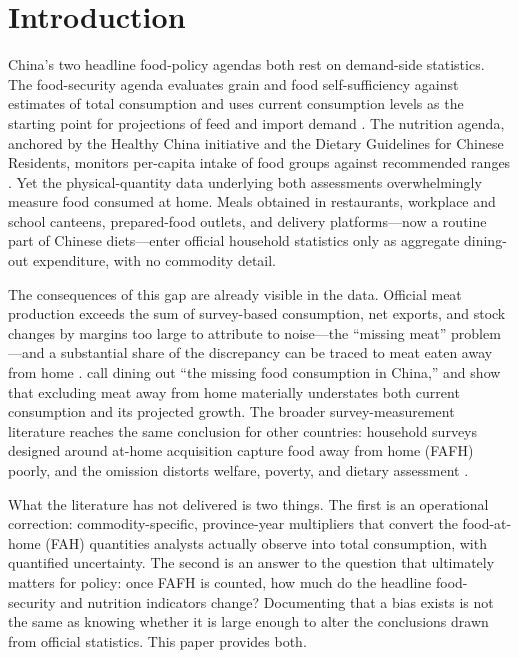 \documentclass[preprint,12pt,authoryear]{elsarticle}
\begin{document}
\section{Introduction}
\label{sec:intro}

China's two headline food-policy agendas both rest on demand-side statistics. The food-security agenda evaluates grain and food self-sufficiency against estimates of total consumption and uses current consumption levels as the starting point for projections of feed and import demand \citep{FukaseMartin2016, HuangYang2017}. The nutrition agenda, anchored by the Healthy China initiative and the Dietary Guidelines for Chinese Residents, monitors per-capita intake of food groups against recommended ranges \citep{CNS2022}. Yet the physical-quantity data underlying both assessments overwhelmingly measure food consumed at home. Meals obtained in restaurants, workplace and school canteens, prepared-food outlets, and delivery platforms---now a routine part of Chinese diets---enter official household statistics only as aggregate dining-out expenditure, with no commodity detail.

The consequences of this gap are already visible in the data. Official meat production exceeds the sum of survey-based consumption, net exports, and stock changes by margins too large to attribute to noise---the ``missing meat'' problem \citep{MaHuangRozelle2004, YuAbler2014, YuAbler2016}---and a substantial share of the discrepancy can be traced to meat eaten away from home \citep{Xiao2015}. \citet{Bai2016DiningOut} call dining out ``the missing food consumption in China,'' and \citet{BaiSealeWahl2020} show that excluding meat away from home materially understates both current consumption and its projected growth. The broader survey-measurement literature reaches the same conclusion for other countries: household surveys designed around at-home acquisition capture food away from home (FAFH) poorly, and the omission distorts welfare, poverty, and dietary assessment \citep{SmithDupriezTroubat2014, Zezza2017, Farfan2017, FiedlerYadav2017, ReitzigEtAl2023}.

What the literature has not delivered is two things. The first is an operational correction: commodity-specific, province-year multipliers that convert the food-at-home (FAH) quantities analysts actually observe into total consumption, with quantified uncertainty. The second is an answer to the question that ultimately matters for policy: once FAFH is counted, how much do the headline food-security and nutrition indicators change? Documenting that a bias exists is not the same as knowing whether it is large enough to alter the conclusions drawn from official statistics. This paper provides both.
\end{document}
